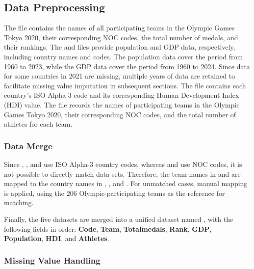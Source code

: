 \documentclass[11pt,twoside]{article}
\numberwithin{Theorem}{section}
\numberwithin{Definition}{section}
\numberwithin{Lemma}{section}
\numberwithin{Algorithm}{section}
\numberwithin{equation}{section}
\begin{document}
\subsection{Data Preprocessing}
The  file contains the names of all participating teams in the Olympic Games Tokyo 2020, their corresponding NOC codes, the total number of medals, and their rankings. The  and  files provide population and GDP data, respectively, including country names and codes. The population data cover the period from 1960 to 2023, while the GDP data cover the period from 1960 to 2024. Since data for some countries in 2021 are missing, multiple years of data are retained to facilitate missing value imputation in subsequent sections. The  file contains each country’s ISO Alpha-3 code and its corresponding Human Development Index (HDI) value. The  file records the names of participating teams in the Olympic Games Tokyo 2020, their corresponding NOC codes, and the total number of athletes for each team.

\subsubsection{Data Merge}
Since , , and  use ISO Alpha-3 country codes, whereas  and  use NOC codes, it is not possible to directly match data sets. Therefore, the team names in  and  are mapped to the country names in , , and . For unmatched cases, manual mapping is applied, using the 206 Olympic-participating teams as the reference for matching.

Finally, the five datasets are merged into a unified dataset named , with the following fields in order: \textbf{Code}, \textbf{Team}, \textbf{Totalmedals}, \textbf{Rank}, \textbf{GDP}, \textbf{Population}, \textbf{HDI}, and \textbf{Athletes}.

\subsubsection{Missing Value Handling}
\end{document}
